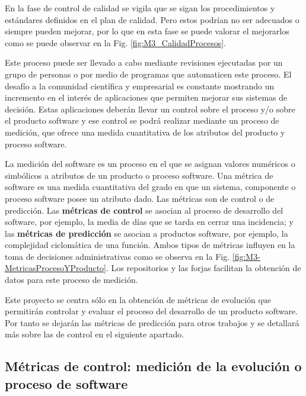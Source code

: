 En la fase de control de calidad se vigila que se sigan los procedimientos y estándares definidos en el plan de calidad. Pero estos podrían no ser adecuados o siempre pueden mejorar, por lo que en esta fase se puede valorar el mejorarlos como se puede observar en la Fig. \ref{fig:M3_CalidadProcesos}.


Este proceso puede ser llevado a cabo mediante revisiones ejecutadas por un grupo de personas o por medio de programas que automaticen este proceso. El  desafío a la comunidad científica y empresarial es constante mostrando un incremento en el interés de aplicaciones que permiten  mejorar sus sistemas de decisión. Estas aplicaciones deberán llevar un control sobre el proceso y/o sobre el producto software y ese control se podrá realizar mediante un proceso de medición, que ofrece una medida cuantitativa de los atributos del producto y proceso software. 

La medición del software es un proceso en el que se asignan valores numéricos o simbólicos a atributos de un producto o proceso software. Una métrica de software es una medida cuantitativa del grado en que un sistema, componente o proceso software posee un atributo dado. Las métricas son de control o de predicción. Las \textbf{métricas de control} se asocian al proceso de desarrollo del software, por ejemplo, la media de días que se tarda en cerrar una incidencia; y las \textbf{métricas de predicción} se asocian a productos software, por ejemplo, la complejidad ciclomática de una función. Ambos tipos de métricas influyen en la toma de decisiones administrativas como se observa en la Fig. \ref{fig:M3-MetricasProcesoYProducto}. Los repositorios y las forjas facilitan la obtención de datos para este proceso de medición.


Este proyecto se centra sólo en la obtención de métricas de evolución que permitirán controlar y evaluar el proceso del desarrollo de un producto software. Por tanto se dejarán las métricas de predicción para otros trabajos y se detallará más sobre las de control en el siguiente apartado.

\subsection{Métricas de control: medición de la evolución o proceso de software}\label{sect:3_3_2_MetricasControl}

